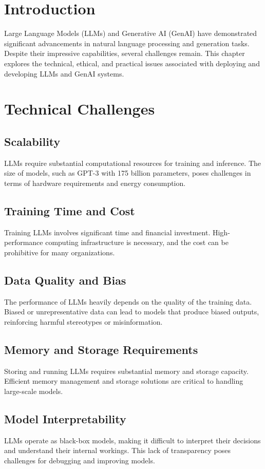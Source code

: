 \section{Introduction}
Large Language Models (LLMs) and Generative AI (GenAI) have demonstrated significant advancements in natural language processing and generation tasks. Despite their impressive capabilities, several challenges remain. This chapter explores the technical, ethical, and practical issues associated with deploying and developing LLMs and GenAI systems.

\section{Technical Challenges}

\subsection{Scalability}
LLMs require substantial computational resources for training and inference. The size of models, such as GPT-3 with 175 billion parameters, poses challenges in terms of hardware requirements and energy consumption.

\subsection{Training Time and Cost}
Training LLMs involves significant time and financial investment. High-performance computing infrastructure is necessary, and the cost can be prohibitive for many organizations.

\subsection{Data Quality and Bias}
The performance of LLMs heavily depends on the quality of the training data. Biased or unrepresentative data can lead to models that produce biased outputs, reinforcing harmful stereotypes or misinformation.

\subsection{Memory and Storage Requirements}
Storing and running LLMs requires substantial memory and storage capacity. Efficient memory management and storage solutions are critical to handling large-scale models.

\subsection{Model Interpretability}
LLMs operate as black-box models, making it difficult to interpret their decisions and understand their internal workings. This lack of transparency poses challenges for debugging and improving models.

